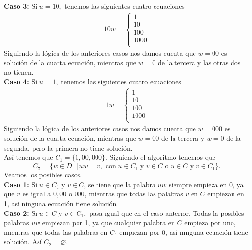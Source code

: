 \begin{sols}
\begin{itemize}
        \textbf{Caso 3:} Si $u=10,$ tenemos las siguientes cuatro ecuaciones
        \begin{align*}
            10w=\begin{cases}
                1\\
                10\\
                100\\
                1000\\
            \end{cases}
        \end{align*}
        Siguiendo la lógica de los anteriores casos nos damos cuenta que $w=00$ es solución de la cuarta ecuación, mientras que $w=0$ de la tercera y las otras dos no tienen.\\

    \textbf{Caso 4:} Si $u=1,$ tenemos las siguientes cuatro ecuaciones
        \begin{align*}
            1w=\begin{cases}
                1\\
                10\\
                100\\
                1000\\
            \end{cases}
        \end{align*}
        Siguiendo la lógica de los anteriores casos nos damos cuenta que $w=000$ es solución de la cuarta ecuación, mientras que $w=00$ de la tercera y $w=0$ de la segunda, pero la primera no tiene solución.\\

        Así tenemos que $C_1=\{0,00,000\}.$ Siguiendo el algoritmo tenemos que 
        $$C_2=\{w\in D^+|\,uw=v, \text{ con } u\in C_1 \text{ y } v\in C \text{ o } u\in C \text{ y } v\in C_1 \}.$$
        Veamos los posibles casos.\\

        \textbf{Caso 1:} Si $u\in C_1$ y $v\in C$, se tiene que la palabra $uw$ siempre empieza en $0$, ya que $u$ es igual a $0,00$ o $000$, mientras que todas las palabras $v$ en $C$ empiezan en 1, así ninguna ecuación tiene solución.\\

        \textbf{Caso 2:} Si $u\in C$ y $v\in C_1,$ pasa igual que en el caso anterior. Todas la posibles palabras $uw$ empiezan por 1, ya que cualquier palabra en $C$ empieza por uno, mientras que todas las palabras en $C_1$ empiezan por 0, así ninguna ecuación tiene solución. Así $C_2=\varnothing.$\\


\end{itemize}
\end{sols}
